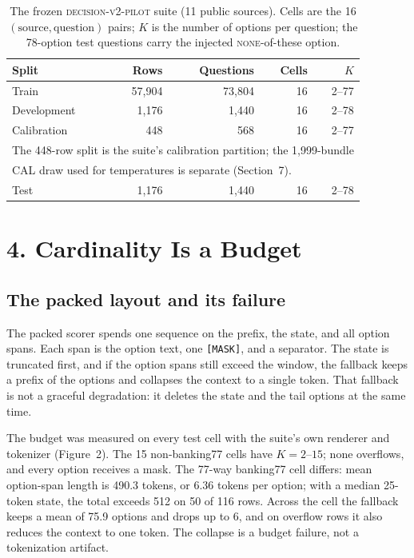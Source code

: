 \documentclass[11pt]{article}
\begin{document}
\begin{table}[t]
\centering
\footnotesize
\caption{The frozen \textsc{decision-v2-pilot} suite (11 public sources). Cells are the 16
$(\text{source},\text{question})$ pairs; $K$ is the number of options per question; the 78-option test questions carry the injected \textsc{none}-of-these option.}
\begin{tabular}{lrrrr}
\toprule
Split & Rows & Questions & Cells & $K$ \\
\midrule
Train & 57{,}904 & 73{,}804 & 16 & 2--77 \\
Development & 1{,}176 & 1{,}440 & 16 & 2--78 \\
Calibration & 448 & 568 & 16 & 2--77 \\
\midrule
\multicolumn{5}{l}{\footnotesize The 448-row split is the suite's calibration partition; the 1{,}999-bundle}\\
\multicolumn{5}{l}{\footnotesize CAL draw used for temperatures is separate (Section~7).}\\
Test & 1{,}176 & 1{,}440 & 16 & 2--78 \\
\bottomrule
\end{tabular}
\end{table}

\section*{4. Cardinality Is a Budget}
\subsection{The packed layout and its failure}
The packed scorer spends one sequence on the prefix, the state, and all option spans. Each span is
the option text, one \texttt{[MASK]}, and a separator. The state is truncated first, and if the
option spans still exceed the window, the fallback keeps a prefix of the options and collapses
the context to a single token. That fallback is not a graceful degradation: it deletes the state
and the tail options at the same time.

The budget was measured on every test cell with the suite's own renderer and tokenizer
(Figure~2). The 15 non-banking77 cells have $K=2$--$15$; none overflows, and
every option receives a mask. The 77-way banking77 cell differs: mean option-span length is 490.3
tokens, or 6.36 tokens per option; with a median 25-token state, the total exceeds 512 on 50 of
116 rows. Across the cell the fallback keeps a mean of 75.9 options and drops up to 6, and on
overflow rows it also reduces the context to one token. The collapse is a budget failure, not a
tokenization artifact.
\end{document}
